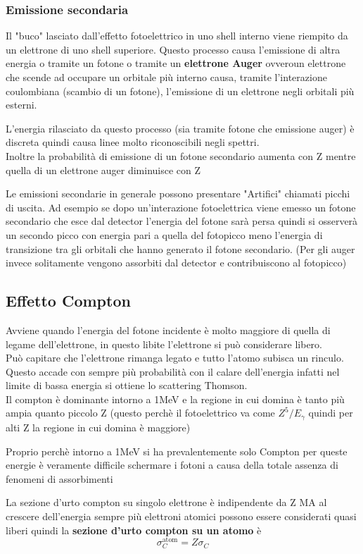 \subsubsection*{Emissione secondaria}
Il "buco" lasciato dall'effetto fotoelettrico in uno shell interno viene riempito da un elettrone di uno shell superiore. Questo processo causa l'emissione di altra energia o tramite un fotone o tramite un \textbf{elettrone Auger} ovveroun elettrone che scende ad occupare un orbitale più interno causa, tramite l'interazione coulombiana (scambio di un fotone), l'emissione di un elettrone negli orbitali più esterni.

\begin{details}
L'energia rilasciato da questo processo (sia tramite fotone che emissione auger) è discreta quindi causa linee molto riconoscibili negli spettri.
\\
Inoltre la probabilità di emissione di un fotone secondario aumenta con Z mentre quella di un elettrone auger diminuisce con Z
\end{details}
\vspace{5pt}
Le emissioni secondarie in generale possono presentare "Artifici" chiamati picchi di uscita.
Ad esempio se dopo un'interazione fotoelettrica viene emesso un fotone secondario che esce dal detector l'energia del fotone sarà persa quindi si osserverà un secondo picco con energia pari a quella del fotopicco meno l'energia di transizione tra gli orbitali che hanno generato il fotone secondario. (Per gli auger invece solitamente vengono assorbiti dal detector e contribuiscono al fotopicco)

\subsection{Effetto Compton}
Avviene quando l'energia del fotone incidente è molto maggiore di quella di legame dell'elettrone, in questo libite l'elettrone si può considerare libero.
\\
Può capitare che l'elettrone rimanga legato e tutto l'atomo subisca un rinculo. Questo accade con sempre più probabilità con il calare dell'energia infatti nel limite di bassa energia si ottiene lo scattering Thomson.
\\
Il compton è dominante intorno a 1MeV e la regione in cui domina è tanto più ampia quanto piccolo Z (questo perchè il fotoelettrico va come $Z^5/E_\gamma$ quindi per alti Z la regione in cui domina è maggiore)
\begin{remark}
    Proprio perchè intorno a 1MeV si ha prevalentemente solo Compton per queste energie è veramente difficile schermare i fotoni a causa della totale assenza di fenomeni di assorbimenti
\end{remark}
La sezione d'urto compton su singolo elettrone è indipendente da Z MA al crescere dell'energia sempre più elettroni atomici possono essere considerati quasi liberi quindi la \textbf{sezione d'urto compton su un atomo} è
\[\sigma_C^{\text{atom}}=Z\sigma_C\]


